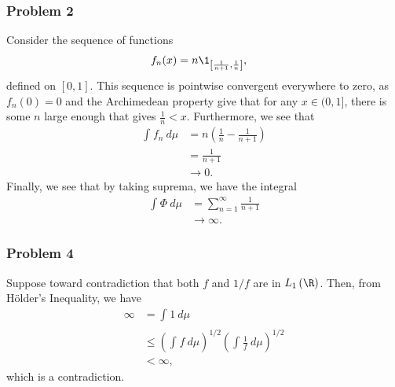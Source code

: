 \documentclass[10pt]{mypackage}
\begin{document}
\subsubsection{Problem 2}%
Consider the sequence of functions
\begin{align*}
  f_n(x) &= n\1_{\left[ \frac{1}{n+1},\frac{1}{n} \right]},
\end{align*}
defined on $\left[ 0,1 \right]$. This sequence is pointwise convergent everywhere to zero, as $f_n(0) = 0$ and the Archimedean property give that for any $x\in (0,1]$, there is some $n$ large enough that gives $\frac{1}{n} < x$. Furthermore, we see that
\begin{align*}
  \int_{}^{} f_n\:d\mu &= n\left( \frac{1}{n}- \frac{1}{n+1} \right)\\
                       &= \frac{1}{n+1}\\
                       &\rightarrow 0.
\end{align*}
Finally, we see that by taking suprema, we have the integral
\begin{align*}
  \int_{}^{} \Phi\:d\mu &= \sum_{n=1}^{\infty}\frac{1}{n+1}\\
                        &\rightarrow \infty.
\end{align*}
\subsubsection{Problem 4}%
Suppose toward contradiction that both $f$ and $1/f$ are in $L_1\left( \R \right)$. Then, from Hölder's Inequality, we have
\begin{align*}
  \infty &= \int_{}^{} 1\:d\mu\\
         &\leq \left( \int_{}^{} f\:d\mu \right)^{1/2} \left( \int_{}^{} \frac{1}{f}\:d\mu \right)^{1/2}\\
         &< \infty,
\end{align*}
which is a contradiction.
\end{document}
